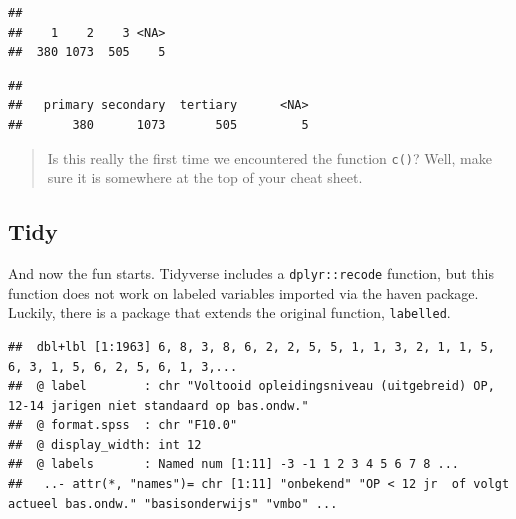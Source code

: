 \documentclass[
]{book}
\newenvironment{Shaded}{\begin{snugshade}}{\end{snugshade}}
\newcommand{\CommentTok}[1]{\textcolor[rgb]{0.56,0.35,0.01}{\textit{#1}}}
\newcommand{\DataTypeTok}[1]{\textcolor[rgb]{0.13,0.29,0.53}{#1}}
\newcommand{\KeywordTok}[1]{\textcolor[rgb]{0.13,0.29,0.53}{\textbf{#1}}}
\newcommand{\NormalTok}[1]{#1}
\newcommand{\OperatorTok}[1]{\textcolor[rgb]{0.81,0.36,0.00}{\textbf{#1}}}
\newcommand{\StringTok}[1]{\textcolor[rgb]{0.31,0.60,0.02}{#1}}
\begin{document}
\begin{verbatim}
## 
##    1    2    3 <NA> 
##  380 1073  505    5
\end{verbatim}

\begin{Shaded}
\end{Shaded}

\begin{verbatim}
## 
##   primary secondary  tertiary      <NA> 
##       380      1073       505         5
\end{verbatim}

\begin{quote}
Is this really the first time we encountered the function \texttt{c()}? Well, make sure it is somewhere at the top of your cheat sheet.
\end{quote}

\hypertarget{tidy-1}{%
\subsection{Tidy}\label{tidy-1}}

And now the fun starts. Tidyverse includes a \texttt{dplyr::recode} function, but this function does not work on labeled variables imported via the haven package. Luckily, there is a package that extends the original function, \texttt{labelled}.

\begin{Shaded}
\end{Shaded}

\begin{verbatim}
##  dbl+lbl [1:1963] 6, 8, 3, 8, 6, 2, 2, 5, 5, 1, 1, 3, 2, 1, 1, 5, 6, 3, 1, 5, 6, 2, 5, 6, 1, 3,...
##  @ label        : chr "Voltooid opleidingsniveau (uitgebreid) OP, 12-14 jarigen niet standaard op bas.ondw."
##  @ format.spss  : chr "F10.0"
##  @ display_width: int 12
##  @ labels       : Named num [1:11] -3 -1 1 2 3 4 5 6 7 8 ...
##   ..- attr(*, "names")= chr [1:11] "onbekend" "OP < 12 jr  of volgt actueel bas.ondw." "basisonderwijs" "vmbo" ...
\end{verbatim}
\end{document}
